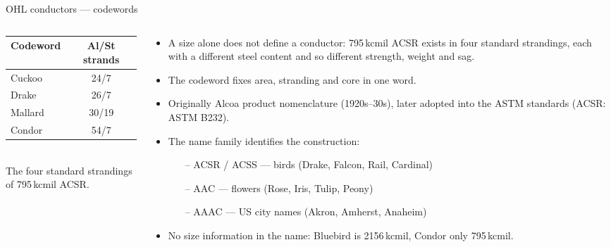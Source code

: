 %
\providecommand{\acfig}[1]{ac-transmission/fig/#1}

\begin{frame}{OHL conductors --- codewords}
  \begin{columns}[T,onlytextwidth]
    \begin{column}{0.33\textwidth}
      \renewcommand{\arraystretch}{1.2}
      {\small
      \begin{tabular}{@{}l c@{}}
        \textbf{Codeword} & \textbf{Al/St strands} \\
        \hline
        Cuckoo  & 24/7  \\
        Drake   & 26/7  \\
        Mallard & 30/19 \\
        Condor  & 54/7  \\
        \hline
      \end{tabular}}\\[0.5em]
      {\color{atGray}\footnotesize The four standard strandings of
      795\,kcmil ACSR.}
    \end{column}
    \begin{column}{0.63\textwidth}
      {\small
      \begin{itemize}
        \setlength{\itemsep}{0.15em}
        \item A size alone does not define a conductor: 795\,kcmil ACSR exists
              in four standard strandings, each with a different steel content
              and so different strength, weight and sag.
        \item The codeword fixes area, stranding and core in one word.
        \item Originally Alcoa product nomenclature (1920s--30s), later
              adopted into the ASTM standards (ACSR: ASTM B232).
        \item The name family identifies the construction:
              \begin{itemize}
                \setlength{\itemsep}{0.1em}
                \item[--] ACSR / ACSS --- birds (Drake, Falcon, Rail, Cardinal)
                \item[--] AAC --- flowers (Rose, Iris, Tulip, Peony)
                \item[--] AAAC --- US city names (Akron, Amherst, Anaheim)
              \end{itemize}
        \item No size information in the name: Bluebird is 2156\,kcmil,
              Condor only 795\,kcmil.
      \end{itemize}}
    \end{column}
  \end{columns}
\end{frame}

